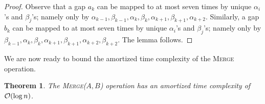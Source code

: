 \documentclass[11pt]{article}
\newcommand{\kwUnion}{Merge}
\newcommand{\Union}{\mbox{\textsc{\kwUnion{}}}}
\newcommand{\Unionx}[2]{\mbox{\textsc{\kwUnion(\ensuremath{#1,#2})}}}
\newcommand{\agap}[1]{\ensuremath{a_{#1}}}
\newcommand{\bgap}[1]{\ensuremath{b_{#1}}}
\newcommand{\maxpotlossa}[1]{\ensuremath{\alpha_{#1}}}
\newcommand{\maxpotlossb}[1]{\ensuremath{\beta_{#1}}}
\newcounter{count}
\newtheorem{thm}[count]{Theorem}
\begin{document}
\begin{proof} 
Observe that a gap $\agap k$ can be mapped to at most seven times by unique $\maxpotlossa i$'s and $\maxpotlossb j$'s; namely only by $\maxpotlossa{k-1}, \maxpotlossb{k-1}, \maxpotlossa{k}, \maxpotlossb{k}, \maxpotlossa{k+1}, \maxpotlossb{k+1}, \maxpotlossa{k+2}$. Similarly, a gap \bgap{k} can be mapped to at most seven times by unique $\maxpotlossa i$'s and $\maxpotlossb j$'s; namely only by $\maxpotlossb{k-1}, \maxpotlossa{k}, \maxpotlossb{k}, \maxpotlossa{k+1}, \maxpotlossb{k+1}, \maxpotlossa{k+2}, \maxpotlossb{k+2}$. The lemma follows. 
\end{proof} 


We are now ready to bound the amortized time complexity of the \Union{} operation. 


\begin{thm} 
\label{thm:unionamortizedcase} 
The \Unionx{A}{B} operation has an amortized time complexity of ${\cal O}(\log n)$. 
\end{thm} 
\end{document}

